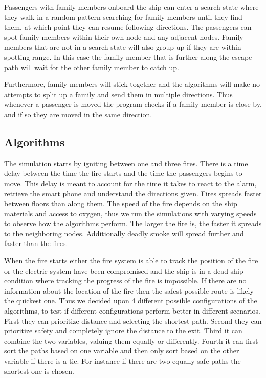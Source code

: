 Passengers with family members onboard the ship can enter a search state where they walk in a random pattern searching for family members until they find them, at which point they can resume following directions. The passengers can spot family members within their own node and any adjacent nodes. Family members that are not in a search state will also group up if they are within spotting range. In this case the family member that is further along the escape path will wait for the other family member to catch up.

Furthermore, family members will stick together and the algorithms will make no attempts to split up a family and send them in multiple directions. Thus whenever a passenger is moved the program checks if a family member is close-by, and if so they are moved in the same direction.

\subsection{Algorithms}
The simulation starts by igniting between one and three fires. There is a time delay between the time the fire starts and the time the passengers begins to move. This delay is meant to account for the time it takes to react to the alarm, retrieve the smart phone and understand the directions given. Fires spreads faster between floors than along them. The speed of the fire depends on the ship materials and access to oxygen, thus we run the simulations with varying speeds to observe how the algorithms perform. The larger the fire is, the faster it spreads to the neighboring nodes. Additionally deadly smoke will spread further and faster than the fires. 

When the fire starts either the fire system is able to track the position of the fire or the electric system have been compromised and the ship is in a dead ship condition where tracking the progress of the fire is impossible. If there are no information about the location of the fire then the safest possible route is likely the quickest one. Thus we decided upon 4 different possible configurations of the algorithms, to test if different configurations perform better in different scenarios. First they can prioritize distance and selecting the shortest path. Second they can prioritize safety and completely ignore the distance to the exit. Third it can combine the two variables, valuing them equally or differently. Fourth it can first sort the paths based on one variable and then only sort based on the other variable if there is a tie. For instance if there are two equally safe paths the shortest one is chosen.

